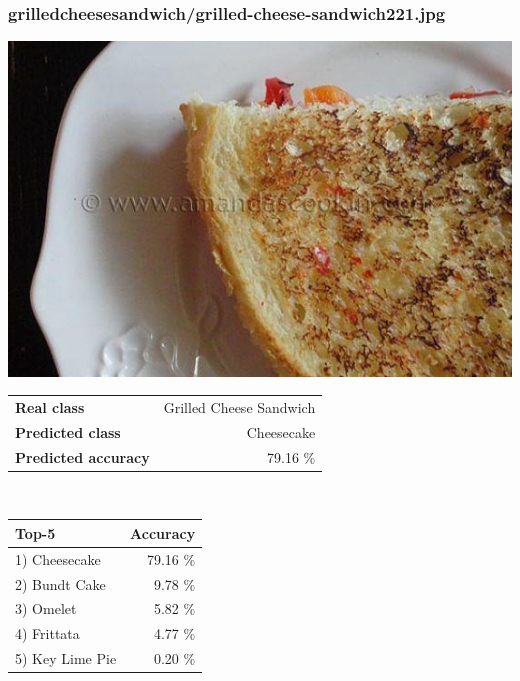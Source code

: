\subsubsection{grilled\textunderscore cheese\textunderscore sandwich/grilled-cheese-sandwich221.jpg}

\begin{minipage}[t]{0.4\textwidth}
	\vspace{0pt}
	\includegraphics[width=\linewidth]{images/evaluation-images/grilled_cheese_sandwich/grilled-cheese-sandwich221.jpg}
\end{minipage}
\hfill
\begin{minipage}[t]{0.5\textwidth}
	\vspace{0pt}\raggedright
	\begin{tabularx}{\textwidth}{X r}
		\small \textbf{Real class} & \small Grilled Cheese Sandwich\\
		\small \textbf{Predicted class} & \small Cheesecake\\
		\small \textbf{Predicted accuracy} & \small 79.16 \%
    \end{tabularx}\\
    
    \vspace{6pt}
	\begin{tabularx}{\textwidth}{X r}
        \small \textbf{Top-5} & \small \textbf{Accuracy} \\
        \hline
		\small 1) Cheesecake & \small 79.16 \%\\\small 2) Bundt Cake & \small 9.78 \%\\\small 3) Omelet & \small 5.82 \%\\\small 4) Frittata & \small 4.77 \%\\\small 5) Key Lime Pie & \small 0.20 \%
    \end{tabularx}
\end{minipage}
    
